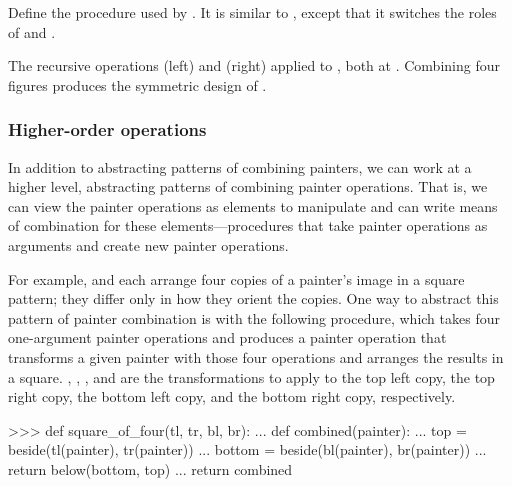 \begin{exerciseGroup}
\label{Exercise 2.44}
 Define the procedure
 used by .  It is similar to
, except that it switches the roles of  and
.
\end{exerciseGroup}

\begin{imageFigure}
  {%
    The recursive operations  (left) and
     (right) applied to , both at .
    Combining four  figures produces the symmetric
     design of .
  }%
  \hspace{5mm}%
\end{imageFigure}

\subsubsection*{Higher-order operations}

In addition to abstracting patterns of combining painters, we can work at a
higher level, abstracting patterns of combining painter operations.  That is,
we can view the painter operations as elements to manipulate and can write
means of combination for these elements---procedures that take painter
operations as arguments and create new painter operations.

For example,  and  each arrange four
copies of a painter's image in a square pattern; they differ only in how they
orient the copies.  One way to abstract this pattern of painter combination is
with the following procedure, which takes four one-argument painter operations
and produces a painter operation that transforms a given painter with those
four operations and arranges the results in a square.  , ,
, and  are the transformations to apply to the top left copy,
the top right copy, the bottom left copy, and the bottom right copy,
respectively.

\begin{codeBlock}
>>> def square_of_four(tl, tr, bl, br):
...     def combined(painter):
...         top = beside(tl(painter), tr(painter))
...         bottom = beside(bl(painter), br(painter))
...         return below(bottom, top)
...     return combined
\end{codeBlock}

